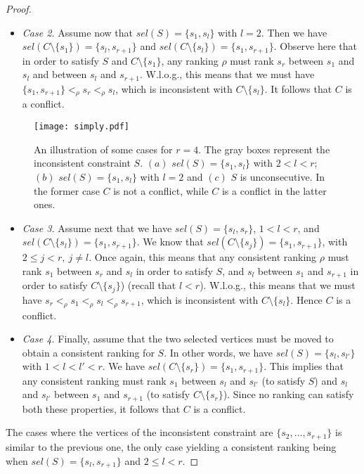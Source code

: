 \documentclass[11pt]{article}
\begin{document}
\begin{proof}
\begin{itemize}
	\item \emph{Case 2.} Assume now that $sel(S) = \{s_1, s_l\}$ with $l = 2$. Then we have $sel(C \setminus \{s_1\}) = \{s_l, s_{r+1}\}$ and $sel(C \setminus \{s_l\}) = \{s_1, s_{r+1}\}$. Observe here that in order to satisfy $S$ and $C \setminus \{s_1\}$, any ranking $\rho$ must rank $s_r$ between $s_1$ and $s_l$ and between $s_l$ and $s_{r+1}$. W.l.o.g., this means 
	that we must have $\{s_1, s_{r+1}\} <_\rho s_r <_\rho s_l$, which is inconsistent 
	with $C \setminus \{s_l\}$. It follows that $C$ is a conflict. 
	
	\end{itemize}
	
	\begin{figure}
	\label{fig:two}
	
		\centerline{\texttt{[image: simply.pdf]}}
		\caption{An illustration of some cases for $r = 4$. The gray boxes represent the inconsistent constraint $S$. $(a)$ $sel(S) = \{s_1, s_l\}$ with $2 < l < r$; $(b)$ $sel(S) = \{s_1, s_l\}$ with $l = 2$ and $(c)$ 
		$S$ is unconsecutive. In the former case $C$ is not a conflict, while $C$ is a conflict in the latter ones. }
	
	\end{figure}
	
	\begin{itemize}

	\item \emph{Case 3.} Assume next that we have $sel(S) = \{s_l, s_r\}$, $1 < l < r$, and $sel(C \setminus \{s_l\}) = \{s_1, s_{r+1}\}$. We know that $sel(C \setminus \{s_j\}) = \{s_1, s_{r+1}\}$, with $2 \leqslant j < r,\ j \neq l$. Once again, this means that any consistent ranking $\rho$ 
	must rank $s_1$ between $s_r$ and $s_l$ in order to satisfy $S$, and $s_l$ between $s_1$ and 
	$s_{r+1}$ in order to satisfy $C \setminus \{s_j\}$) (recall that $l < r$). W.l.o.g., this means that we must have 
	$s_r <_\rho s_1 <_\rho s_l <_\rho s_{r+1}$, which is inconsistent with $C \setminus \{s_l\}$. Hence $C$ is a conflict. 
	
	\item \emph{Case 4.} Finally, assume that the two selected vertices must be moved to obtain a consistent ranking for $S$. In other words, we have $sel(S) = \{s_l, s_{l'}\}$ with $1 < l < l' < r$. We have $sel(C \setminus \{s_r\}) = \{s_1, s_{r+1}\}$. This implies that any consistent ranking must rank $s_1$ between 
$s_l$ and $s_{l'}$ (to satisfy $S$) and $s_{l}$ and $s_{l'}$ between $s_1$ and 
$s_{r+1}$ (to satisfy $C \setminus \{s_r\}$). Since no ranking can satisfy both these 
properties, it follows that $C$ is a conflict. 
	\end{itemize}
	
	The cases where the vertices of the inconsistent constraint are $\{s_2, \ldots, s_{r+1}\}$ is similar to the previous one, the only case yielding a consistent ranking being when $sel(S) = \{s_l, s_{r+1}\}$ and $2 \leqslant l < r$.
\end{proof}
\end{document}
